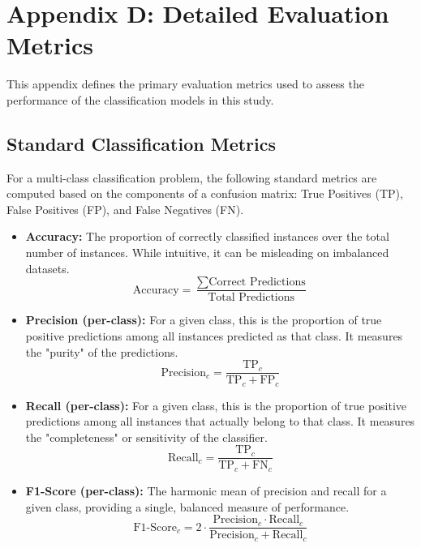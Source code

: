 
\chapter{Appendix D: Detailed Evaluation Metrics}
\label{app:metrics}

This appendix defines the primary evaluation metrics used to assess the performance of the classification models in this study.

\section{Standard Classification Metrics}

For a multi-class classification problem, the following standard metrics are computed based on the components of a confusion matrix: True Positives (TP), False Positives (FP), and False Negatives (FN).

\begin{itemize}
    \item \textbf{Accuracy:} The proportion of correctly classified instances over the total number of instances. While intuitive, it can be misleading on imbalanced datasets.
    \begin{equation}
    \text{Accuracy} = \frac{\sum \text{Correct Predictions}}{\text{Total Predictions}}
    \end{equation}

    \item \textbf{Precision (per-class):} For a given class, this is the proportion of true positive predictions among all instances predicted as that class. It measures the "purity" of the predictions.
    \begin{equation}
    \text{Precision}_c = \frac{\text{TP}_c}{\text{TP}_c + \text{FP}_c}
    \end{equation}

    \item \textbf{Recall (per-class):} For a given class, this is the proportion of true positive predictions among all instances that actually belong to that class. It measures the "completeness" or sensitivity of the classifier.
    \begin{equation}
    \text{Recall}_c = \frac{\text{TP}_c}{\text{TP}_c + \text{FN}_c}
    \end{equation}

    \item \textbf{F1-Score (per-class):} The harmonic mean of precision and recall for a given class, providing a single, balanced measure of performance.
    \begin{equation}
    \text{F1-Score}_c = 2 \cdot \frac{\text{Precision}_c \cdot \text{Recall}_c}{\text{Precision}_c + \text{Recall}_c}
    \end{equation}
\end{itemize}


